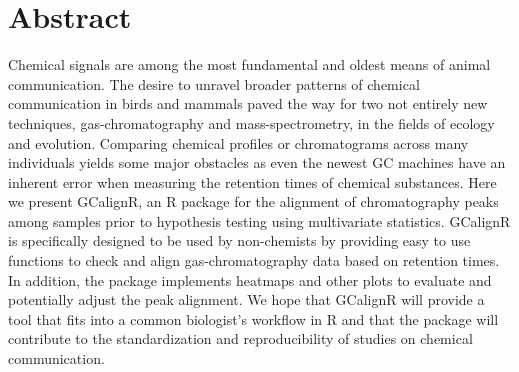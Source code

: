 \documentclass[10pt,letterpaper]{article}
\begin{document}
\section*{Abstract}
Chemical signals are among the most fundamental and oldest means of animal communication. The desire to unravel broader patterns of chemical communication in birds and mammals paved the way for two not entirely new techniques, gas-chromatography and mass-spectrometry, in the fields of ecology and evolution. Comparing chemical profiles or chromatograms across many individuals yields some major obstacles as even the newest GC machines have an inherent error when measuring the retention times of chemical substances. Here we present GCalignR, an R package for the alignment of chromatography peaks among samples prior to hypothesis testing using multivariate statistics. GCalignR is specifically designed to be used by non-chemists by providing easy to use functions to check and align gas-chromatography data based on retention times. In addition, the package implements heatmaps and other plots to evaluate and potentially adjust the peak alignment. We hope that GCalignR will provide a tool that fits into a common biologist's workflow in R and that the package will contribute to the standardization and reproducibility of studies on chemical communication.
\linenumbers

\end{document}
